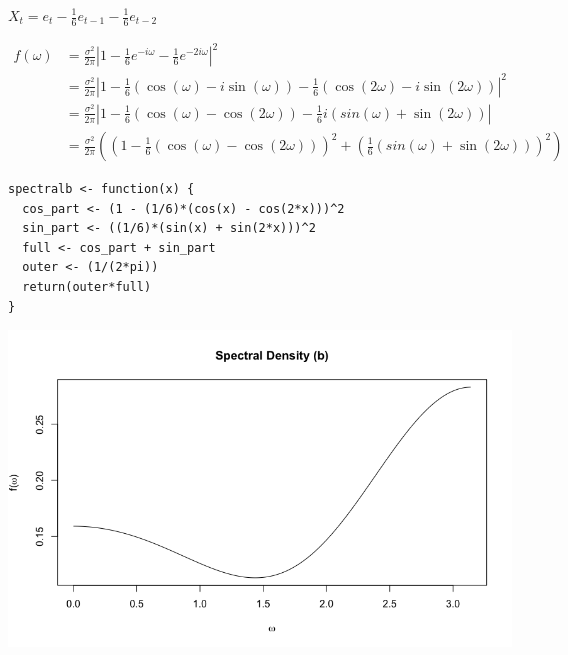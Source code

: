 \documentclass[10pt,a4paper]{exam}
\begin{document}
\begin{questions}
\begin{parts}
\item $X_t = e_t - \frac{1}{6}e_{t-1} - \frac{1}{6}e_{t-2}$
\begin{solution}
\begin{align*}
f(\omega)		&= \frac{\sigma^2}{2\pi} \left| 1 - \frac{1}{6}e^{-i\omega} - \frac{1}{6}e^{-2i\omega} \right|^2\\
					&=  \frac{\sigma^2}{2\pi} \left| 1 - \frac{1}{6}\left(\cos(\omega) - i\sin(\omega)\right) - \frac{1}{6}\left(\cos(2\omega) - i\sin(2\omega) \right) \right|^2\\
					&=  \frac{\sigma^2}{2\pi} \left| 1 - \frac{1}{6}\left(\cos(\omega) - \cos(2\omega)\right) - \frac{1}{6}i\left(sin(\omega) + \sin(2\omega) \right) \right|\\
					&= \frac{\sigma^2}{2\pi} \left(\left( 1 - \frac{1}{6}\left(\cos(\omega) - \cos(2\omega)\right)\right)^2 + \left(\frac{1}{6}\left(sin(\omega) + \sin(2\omega) \right)\right)^2 \right)
\end{align*}
\begin{verbatim}
spectralb <- function(x) {
  cos_part <- (1 - (1/6)*(cos(x) - cos(2*x)))^2
  sin_part <- ((1/6)*(sin(x) + sin(2*x)))^2
  full <- cos_part + sin_part
  outer <- (1/(2*pi))
  return(outer*full)
}
\end{verbatim}
\begin{center}
\includegraphics[width = .9\linewidth]{1b}
\end{center}
\end{solution}
\pagebreak




\end{parts}
\end{questions}
\end{document}
